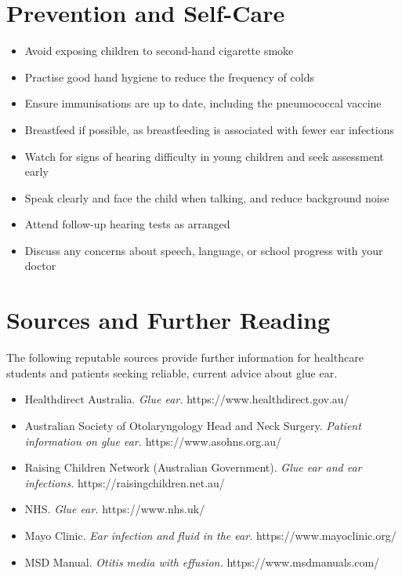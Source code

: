 \section*{Prevention and Self-Care}
\begin{itemize}
    \item Avoid exposing children to second-hand cigarette smoke
    \item Practise good hand hygiene to reduce the frequency of colds
    \item Ensure immunisations are up to date, including the pneumococcal vaccine
    \item Breastfeed if possible, as breastfeeding is associated with fewer ear infections
    \item Watch for signs of hearing difficulty in young children and seek assessment early
    \item Speak clearly and face the child when talking, and reduce background noise
    \item Attend follow-up hearing tests as arranged
    \item Discuss any concerns about speech, language, or school progress with your doctor
\end{itemize}

\section*{Sources and Further Reading}
The following reputable sources provide further information for healthcare students and patients seeking reliable, current advice about glue ear.

\begin{itemize}
    \item Healthdirect Australia. \textit{Glue ear.} https://www.healthdirect.gov.au/
    \item Australian Society of Otolaryngology Head and Neck Surgery. \textit{Patient information on glue ear.} https://www.asohns.org.au/
    \item Raising Children Network (Australian Government). \textit{Glue ear and ear infections.} https://raisingchildren.net.au/
    \item NHS. \textit{Glue ear.} https://www.nhs.uk/
    \item Mayo Clinic. \textit{Ear infection and fluid in the ear.} https://www.mayoclinic.org/
    \item MSD Manual. \textit{Otitis media with effusion.} https://www.msdmanuals.com/
\end{itemize}
